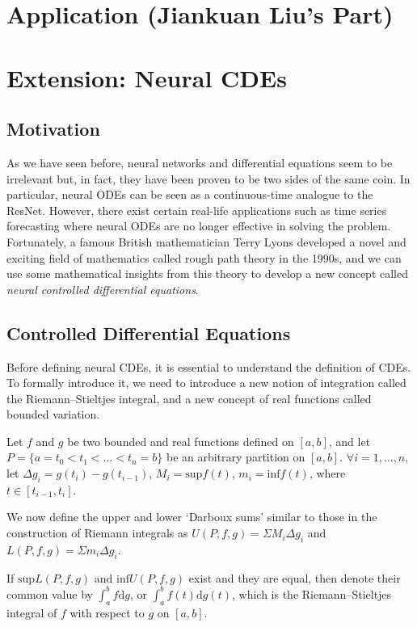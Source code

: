 \documentclass[a4paper,11pt,titlepage]{article}
\theoremstyle{definition}
\theoremstyle{plain}
\theoremstyle{remark}
\begin{document}
\pagebreak
\section{Application (Jiankuan Liu's Part)}

\pagebreak
\section{Extension: Neural CDEs}

\subsection{Motivation}

As we have seen before, neural networks and differential equations seem to be irrelevant but, in fact, they have been proven to be two sides of the same coin. In particular, neural ODEs can be seen as a continuous-time analogue to the ResNet. However, there exist certain real-life applications such as time series forecasting where neural ODEs are no longer effective in solving the problem. Fortunately, a famous British mathematician Terry Lyons developed a novel and exciting field of mathematics called rough path theory in the 1990s, and we can use some mathematical insights from this theory to develop a new concept called \textit{neural controlled differential equations}.

\subsection{Controlled Differential Equations}

Before defining neural CDEs, it is essential to understand the definition of CDEs. To formally introduce it, we need to introduce a new notion of integration called the Riemann–Stieltjes integral, and a new concept of real functions called bounded variation.

Let $f$ and $g$ be two bounded and real functions defined on $[a,b]$, and let $P=\{a=t_0<t_1<...<t_n=b\}$ be an arbitrary partition on $[a,b]$. $\forall i = 1,...,n$, let $\Delta g_i = g(t_i) - g(t_{i-1})$, $M_i=\mathrm{sup}f(t)$, $m_i=\mathrm{inf}f(t)$, where $t\in[t_{i-1},t_i]$.

We now define the upper and lower ‘Darboux sums’ similar to those in the construction of Riemann integrals as $U(P,f,g)=\Sigma M_i\Delta g_i$ and $L(P,f,g)=\Sigma m_i\Delta g_i$.

If $\mathrm{sup}L(P,f,g)$ and $\mathrm{inf}U(P,f,g)$ exist and they are equal, then denote their common value by $\int^b_af\mathrm{d}g$, or $\int^b_af(t)\mathrm{d}g(t)$, which is the Riemann–Stieltjes integral of $f$ with respect to $g$ on $[a,b]$.
\end{document}
